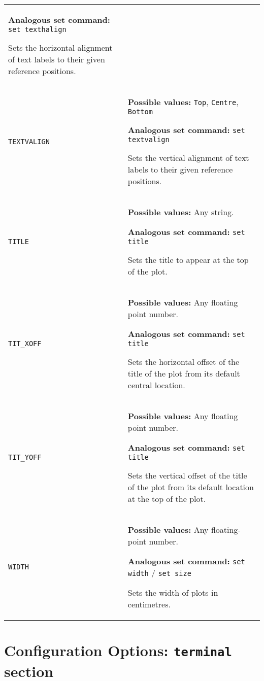 \begin{longtable}{p{3.4cm}p{9cm}}
                   \textbf{Analogous set command:} \texttt{set texthalign}\index{set texthalign command@\texttt{set texthalign} command}

                   Sets the horizontal alignment of text labels to their given reference positions.
                   \\
\texttt{TEXTVALIGN} & \textbf{Possible values:} \texttt{Top}, \texttt{Centre}, \texttt{Bottom}

                   \textbf{Analogous set command:} \texttt{set textvalign}\index{set textvalign command@\texttt{set textvalign} command}

                   Sets the vertical alignment of text labels to their given reference positions.
                   \\
\texttt{TITLE} & \textbf{Possible values:} Any string.

                   \textbf{Analogous set command:} \texttt{set title}\index{set title command@\texttt{set title} command}

                   Sets the title to appear at the top of the plot.
                   \\
\texttt{TIT\_XOFF} & \textbf{Possible values:} Any floating point number.

                   \textbf{Analogous set command:} \texttt{set title}

                   Sets the horizontal offset of the title of the plot from its default central location.
                   \\
\texttt{TIT\_YOFF} & \textbf{Possible values:} Any floating point number.

                   \textbf{Analogous set command:} \texttt{set title}

                   Sets the vertical offset of the title of the plot from its default location at the top of the plot.
                   \\
\texttt{WIDTH} & \textbf{Possible values:} Any floating-point number.

                   \textbf{Analogous set command:} \texttt{set width} / \texttt{set size}\index{set width command@\texttt{set width} command}\index{set size command@\texttt{set size} command}

                   Sets the width of plots in centimetres.
                   \\
\end{longtable}

\section{Configuration Options: \texttt{terminal} section}
\label{configfile_terminal}

